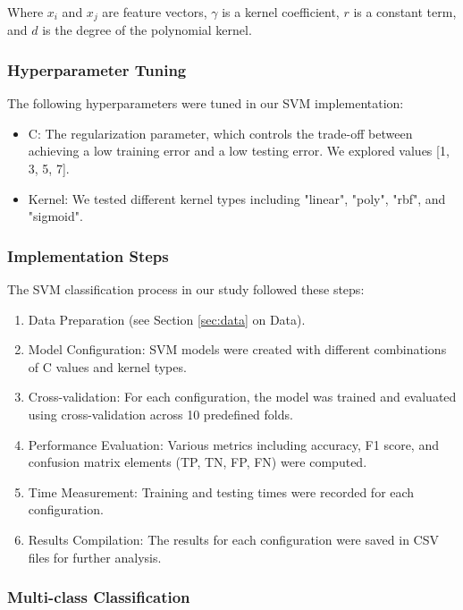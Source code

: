 Where $x_i$ and $x_j$ are feature vectors, $\gamma$ is a kernel coefficient, $r$ is a constant term, and $d$ is the degree of the polynomial kernel.

\subsubsection{Hyperparameter Tuning}

The following hyperparameters were tuned in our SVM implementation:

\begin{itemize}
    \item C: The regularization parameter, which controls the trade-off between achieving a low training error and a low testing error. We explored values [1, 3, 5, 7].
    \item Kernel: We tested different kernel types including "linear", "poly", "rbf", and "sigmoid".
\end{itemize}

\subsubsection{Implementation Steps}

The SVM classification process in our study followed these steps:

\begin{enumerate}
    \item Data Preparation (see Section \ref{sec:data} on Data).
    \item Model Configuration: SVM models were created with different combinations of C values and kernel types.
    \item Cross-validation: For each configuration, the model was trained and evaluated using cross-validation across 10 predefined folds.
    \item Performance Evaluation: Various metrics including accuracy, F1 score, and confusion matrix elements (TP, TN, FP, FN) were computed.
    \item Time Measurement: Training and testing times were recorded for each configuration.
    \item Results Compilation: The results for each configuration were saved in CSV files for further analysis.
\end{enumerate}

\subsubsection{Multi-class Classification}

